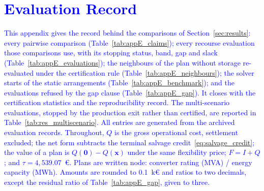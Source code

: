 \clearpage
\section{\textcolor{blue}{Evaluation Record}}
\label{app:results}

\textcolor{blue}{
    This appendix gives the record behind the comparisons of Section~\ref{sec:results}: every pairwise comparison (Table~\ref{tab:appE_claims}); every recourse evaluation those comparisons use, with its stopping status, band, gap and slack (Table~\ref{tab:appE_evaluations}); the neighbours of the plan without storage re-evaluated under the certification rule (Table~\ref{tab:appE_neighbours}); the solver starts of the static arrangements (Table~\ref{tab:appE_benchmark}); and the evaluations refused by the gap clause (Table~\ref{tab:appE_gap}). It closes with the certification statistics and the reproducibility record. The multi-scenario evaluations, stopped by the production exit rather than certified, are reported in Table~\ref{tab:res_multiscenario}. All entries are generated from the archived evaluation records. Throughout, $Q$ is the gross operational cost, settlement excluded; the net form subtracts the terminal salvage credit~\eqref{eq:salvage_credit}; the value of a plan is $Q(\boldsymbol{0}) - Q(\boldsymbol{x})$ under the same flexibility price; $F = I + Q$; and $\tau = 4{,}539.07$~\euro{}. Plans are written node: converter rating (MVA) / energy capacity (MWh). Amounts are rounded to 0.1~k\euro{} and ratios to two decimals, except the residual ratio of Table~\ref{tab:appE_gap}, given to three.
}

